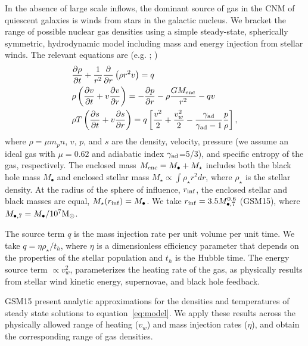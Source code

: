 \documentclass[usenatbib,fleqn]{mnras}
\newcommand{\Mbh}[1][]{M_{\bullet#1}}
\newcommand{\Menc}{M_{\rm enc}}
\newcommand{\Msun}{{\rm M_\odot}}
\begin{document}
In the absence of large scale inflows, the dominant source of gas in
the CNM of quiescent galaxies is winds from stars in the galactic
nucleus. We bracket the range of possible nuclear gas densities using
a simple steady-state, spherically symmetric, hydrodynamic model
including mass and energy injection from stellar winds. The relevant
equations are (e.g. \citealt{Holzer+1970}; \citealt{Quataert2004})
\begin{align}
  &\frac{\partial \rho}{\partial t}+\frac{1}{r^2}\frac{\partial}{\partial r}\left(\rho r^2 v\right)=q \label{eq:drhodt}\\
  &\rho \left(\frac{\partial v}{\partial t} + v\frac{\partial
      v}{\partial r}\right) =-\frac{\partial p}{\partial r}- \rho\frac{GM_{\rm enc}}{r^{2}} -q v \label{eq:dvdt}\\
  &\rho T\left(\frac{\partial s}{\partial t} + v\frac{\partial
      s}{\partial
      r}\right)=q\left[\frac{v^2}{2}+\frac{v_w^2}{2}-\frac{\gamma_{\rm
      ad}}{\gamma_{\rm ad}-1}
    \frac{p}{\rho} \right] ,
\label{eq:model}
\end{align}
where $\rho = \mu m_p n$, $v$, $p$, and $s$ are the density, velocity,
pressure (we assume an ideal gas with $\mu = 0.62$ and adiabatic index
$\gamma_{\rm ad}$=5/3), and specific entropy of the gas,
respectively. The enclosed mass $\Menc = M_{\bullet} + M_{\star}$
includes both the black hole mass $M_{\bullet}$ and enclosed stellar
mass $M_{\star} \propto \int \rho_{\star}r^{2}dr$, where
$\rho_{\star}$ is the stellar density.  At the radius of the sphere of
influence, $r_{\rm inf}$, the enclosed stellar and black masses are
equal, $M_{\star}(r_{\rm inf})=\Mbh$.  We take $r_{\rm inf}=3.5
\Mbh[,7]^{0.6}$ (GSM15), where $\Mbh[,7]=\Mbh/10^7 \Msun$.

The source term $q$ is the mass injection rate per unit volume per
unit time. We take $q=\eta \rho_{\star}/t_h$, where $\eta$ is a
dimensionless efficiency parameter that depends on the properties of
the stellar population and $t_h$ is the Hubble time. The energy source
term $\propto v_w^{2}$, parameterizes the heating rate of the gas, as
physically results from stellar wind kinetic energy, supernovae, and
black hole feedback.

GSM15 present analytic approximations for the
densities and temperatures of steady state solutions to
equation~\eqref{eq:model}. We apply these results across the
physically allowed range of heating ($v_w$) and mass injection
rates ($\eta$), and obtain the corresponding range of gas densities.
\end{document}
